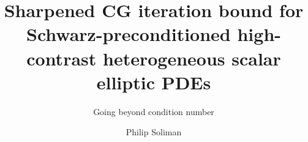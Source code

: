 \documentclass{../tudelft-report}
\begin{document}
\frontmatter
\title{Sharpened CG iteration bound for Schwarz-preconditioned high-contrast heterogeneous scalar elliptic PDEs}
\subtitle{Going beyond condition number} 
\author{Philip Soliman}
\subject{WI5005: Thesis Project (Interim Thesis)} %
\makecover

\tableofcontents


\newpage

\mainmatter
\pagestyle{fancy}

\newpage
{}

\nochapterimage
\newpage

\newpage

\newpage

\newpage


\nochapterimage
\printbibliography
\end{document}
